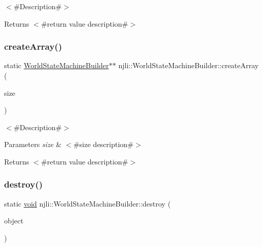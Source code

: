 $<$\#\+Description\#$>$

\begin{DoxyReturn}{Returns}
$<$\#return value description\#$>$ 
\end{DoxyReturn}
\mbox{\label{classnjli_1_1_world_state_machine_builder_a885f1bf64c1b4478218598e3a36d3061}} 
\subsubsection{\texorpdfstring{create\+Array()}{createArray()}}
{\footnotesize\ttfamily static \mbox{\hyperlink{classnjli_1_1_world_state_machine_builder}{World\+State\+Machine\+Builder}}$\ast$$\ast$ njli\+::\+World\+State\+Machine\+Builder\+::create\+Array (\begin{DoxyParamCaption}\item[{const \mbox{\hyperlink{_util_8h_a10e94b422ef0c20dcdec20d31a1f5049}{u32}}}]{size }\end{DoxyParamCaption})\hspace{0.3cm}{\ttfamily [static]}}

$<$\#\+Description\#$>$


\begin{DoxyParams}{Parameters}
{\em size} & $<$\#size description\#$>$\\
\hline
\end{DoxyParams}
\begin{DoxyReturn}{Returns}
$<$\#return value description\#$>$ 
\end{DoxyReturn}
\mbox{\label{classnjli_1_1_world_state_machine_builder_aca5fe85bd19979148c33b16f7b69c811}} 
\subsubsection{\texorpdfstring{destroy()}{destroy()}}
{\footnotesize\ttfamily static \mbox{\hyperlink{_thread_8h_af1e856da2e658414cb2456cb6f7ebc66}{void}} njli\+::\+World\+State\+Machine\+Builder\+::destroy (\begin{DoxyParamCaption}\item[{\mbox{\hyperlink{classnjli_1_1_world_state_machine_builder}{World\+State\+Machine\+Builder}} $\ast$}]{object }\end{DoxyParamCaption})\hspace{0.3cm}{\ttfamily [static]}}

